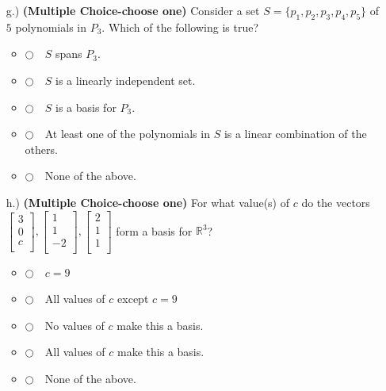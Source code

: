 \documentclass[12pt]{extarticle}
\newcommand{\chooseone}{{\Large$\Circle$\ \ }}
\begin{document}
\begin{enumerate}
\begin{itemize}
\vfill

\item[g.)]  \textbf{(Multiple Choice-choose one)} Consider a set $S=\{p_1, p_2, p_3, p_4, p_5\}$ of $5$ polynomials in $P_3$. Which of the following is true?

\begin{itemize}[label={}]
\item \chooseone $S$ spans $P_3$.
\item \chooseone $S$ is a linearly independent set.
\item \chooseone $S$ is a basis for $P_3$.
\item \chooseone At least one of the polynomials in $S$ is a linear combination of the others.
\item \chooseone None of the above.
\end{itemize}

\vfill

\item[h.)] \textbf{(Multiple Choice-choose one)}  For what value(s) of $c$ do the vectors $\begin{bmatrix} 3 \\ 0 \\ c\\\end{bmatrix},\begin{bmatrix} 1 \\ 1 \\ -2\\\end{bmatrix},\begin{bmatrix} 2 \\ 1 \\ 1\\\end{bmatrix} $ form a basis for $\mathbb{R}^3$?
\begin{itemize}[label={}]
\item \chooseone $c=9$
\item \chooseone All values of $c$ except $c=9$
\item \chooseone No values of $c$ make this a basis.
\item \chooseone All values of $c$ make this a basis.
\item \chooseone None of the above.
\end{itemize}
\vfill

  
\end{itemize}



    \newpage
    



\end{enumerate}
\end{document}
